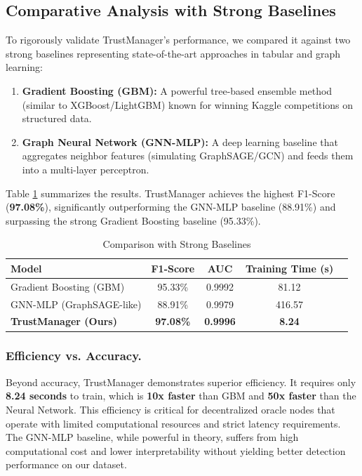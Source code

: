 \subsection{Comparative Analysis with Strong Baselines}
To rigorously validate TrustManager's performance, we compared it against two strong baselines representing state-of-the-art approaches in tabular and graph learning:
\begin{enumerate}
    \item \textbf{Gradient Boosting (GBM):} A powerful tree-based ensemble method (similar to XGBoost/LightGBM) known for winning Kaggle competitions on structured data.
    \item \textbf{Graph Neural Network (GNN-MLP):} A deep learning baseline that aggregates neighbor features (simulating GraphSAGE/GCN) and feeds them into a multi-layer perceptron.
\end{enumerate}

Table \ref{tab:strong_baselines} summarizes the results. TrustManager achieves the highest F1-Score (\textbf{97.08\%}), significantly outperforming the GNN-MLP baseline (88.91\%) and surpassing the strong Gradient Boosting baseline (95.33\%).

\begin{table}[htbp]
\centering
\caption{Comparison with Strong Baselines}
\label{tab:strong_baselines}
\begin{tabular}{lcccc}
\toprule
\textbf{Model} & \textbf{F1-Score} & \textbf{AUC} & \textbf{Training Time (s)} \\
\midrule
Gradient Boosting (GBM) & 95.33\% & 0.9992 & 81.12 \\
GNN-MLP (GraphSAGE-like) & 88.91\% & 0.9979 & 416.57 \\
\textbf{TrustManager (Ours)} & \textbf{97.08\%} & \textbf{0.9996} & \textbf{8.24} \\
\bottomrule
\end{tabular}
\end{table}

\subsubsection{Efficiency vs. Accuracy.}
Beyond accuracy, TrustManager demonstrates superior efficiency. It requires only \textbf{8.24 seconds} to train, which is \textbf{10x faster} than GBM and \textbf{50x faster} than the Neural Network. This efficiency is critical for decentralized oracle nodes that operate with limited computational resources and strict latency requirements. The GNN-MLP baseline, while powerful in theory, suffers from high computational cost and lower interpretability without yielding better detection performance on our dataset.
